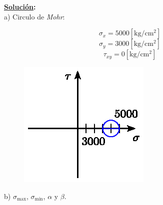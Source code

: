 \documentclass[letter,10pt,twoside]{article}
\begin{document}
\textbf{\underline{Solución}:} \\

a) Circulo de \emph{Mohr}:

\begin{equation*}
    \sigma_x = 5000[\text{kg}/\text{cm}^2]
\end{equation*}
\begin{equation*}
    \sigma_y = 3000[\text{kg}/\text{cm}^2]
\end{equation*}
\begin{equation*}
    \tau_{xy} = 0[\text{kg}/\text{cm}^2]
\end{equation*}

\begin{figure}[H]
\centering
\includegraphics[scale=1.2]{resources/f41.eps}
\end{figure}

b) $\sigma_{\text{max}}$, $\sigma_{\text{min}}$, $\alpha$ y $\beta$.
\end{document}
